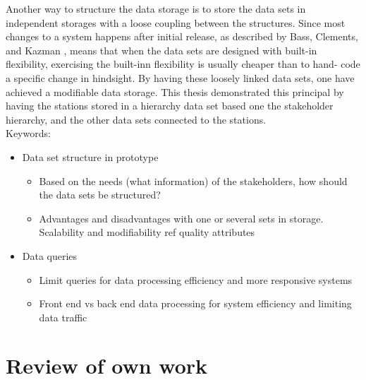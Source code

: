 Another way to structure the data storage is to store the data sets in
independent storages with a loose coupling between the structures. Since most 
changes to a system happens after initial release, as described by Bass, 
Clements, and Kazman \cite[pp. 117-124]{Bass:2012:SAP:2392670},
means that when the data sets are designed with built-in flexibility, 
exercising the built-inn flexibility is usually cheaper than to hand-
code a specific change in hindsight. By having these loosely linked data sets,
one have achieved a modifiable data storage. This thesis demonstrated this
principal by having the stations stored in a hierarchy data set based one the 
stakeholder hierarchy, and the other data sets connected to the stations.\\



Keywords:
\begin{itemize}
	\item Data set structure in prototype
	\begin{itemize}
		\item Based on the needs (what information) of the stakeholders, how 
		should the data sets be structured?
		\item Advantages and disadvantages with one or several sets in storage.
		Scalability and modifiability ref quality attributes \cite{Bass:2012:SAP:2392670}
	\end{itemize}
	\item Data queries
	\begin{itemize}
		\item Limit queries for data processing efficiency 
		and more responsive systems
		\item Front end vs back end data processing for system efficiency and
		limiting data traffic
	\end{itemize}
\end{itemize}

\section{Review of own work} %
\label{sec:review_of_own_work}
